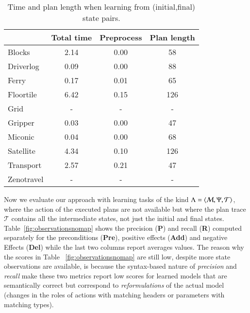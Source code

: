 \begin{table}
\begin{footnotesize}
	\begin{center}
		\begin{tabular}{l|c|c|c|}			
			 & Total time & Preprocess & Plan length  \\
			\hline
            Blocks & 2.14 & 0.00 & 58  \\
            Driverlog & 0.09 & 0.00 & 88 \\
            Ferry & 0.17 & 0.01 & 65 \\
            Floortile & 6.42 & 0.15 & 126 \\
            Grid & - & - & - \\
            Gripper & 0.03 & 0.00 & 47 \\
            Miconic & 0.04 & 0.00 & 68 \\
            Satellite & 4.34 & 0.10 & 126 \\
            Transport & 2.57 & 0.21 & 47 \\			
            Zenotravel & - & - & - \\
		\end{tabular}
	\end{center}
        \end{footnotesize}
	\caption{\small Time and plan length when learning from (initial,final) state pairs.}
	\label{tab:time_states}	
\end{table}

Now we evaluate our approach with learning tasks of the kind $\Lambda={\langle \mathcal{M},\Psi,\mathcal{T} \rangle}$, where the action of the executed plans are not available but where the plan trace $\mathcal{T}$ contains all the intermediate states, not just the initial and final states. Table~\ref{fig:observationsnomap} shows the precision ({\bf P}) and recall ({\bf R}) computed separately for the preconditions ({\bf Pre}), positive effects ({\bf Add}) and negative Effects ({\bf Del}) while the last two columns report averages values. The reason why the scores in Table ~\ref{fig:observationsnomap} are still low, despite more state observations are available, is because the syntax-based nature of {\em precision} and {\em recall} make these two metrics report low scores for learned models that are semantically correct but correspond to {\em reformulations} of the actual model (changes in the roles of actions with matching headers or parameters with matching types).

